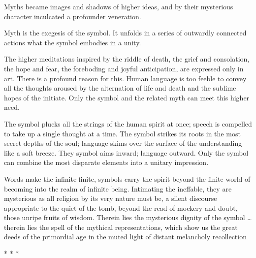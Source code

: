 \begin{quotex}
Myths became images and shadows of higher ideas, and by their mysterious character inculcated a profounder veneration. 

Myth is the exegesis of the symbol. It unfolds in a series of outwardly connected actions what the symbol embodies in a unity.

The higher meditations inspired by the riddle of death, the grief and consolation, the hope and fear, the foreboding and joyful anticipation, are expressed only in art. There is a profound reason for this. Human language is too feeble to convey all the thoughts aroused by the alternation of life and death and the sublime hopes of the initiate. Only the symbol and the related myth can meet this higher need.

The symbol plucks all the strings of the human spirit at once; speech is compelled to take up a single thought at a time. The symbol strikes its roots in the most secret depths of the soul; language skims over the surface of the understanding like a soft breeze. They symbol aims inward; language outward. Only the symbol can combine the most disparate elements into a unitary impression.

Words make the infinite finite, symbols carry the spirit beyond the finite world of becoming into the realm of infinite being. Intimating the ineffable, they are mysterious as all religion by its very nature must be, a silent discourse appropriate to the quiet of the tomb, beyond the read of mockery and doubt, those unripe fruits of wisdom. Therein lies the mysterious dignity of the symbol … therein lies the spell of the mythical representations, which show us the great deeds of the primordial age in the muted light of distant melancholy recollection 

\end{quotex}



\begin{center}* * *\end{center}

